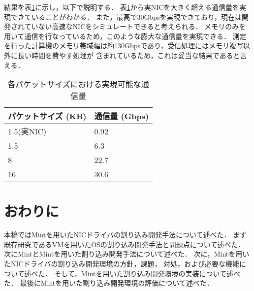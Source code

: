 \documentclass[submit,techreq,noauthor,dvipdfmx]{ipsj}
\begin{document}
結果を表\ref{throughput-nic}に示し，以下で説明する．
表\ref{throughput-nic}から実NICを大きく超える通信量を実現できていることがわかる．
また，最高で30Gbpsを実現できており，現在は開発されていない高速なNICをシミュレートできると考えられる．
メモリのみを用いて通信を行なっているため，このような膨大な通信量を実現できる．
測定を行った計算機のメモリ帯域幅は約130Gbpsであり，受信処理にはメモリ複写以外に長い時間を費やす処理が
含まれているため，これは妥当な結果であると言える．

\begin{table}[h]
    \caption{各パケットサイズにおける実現可能な通信量}
    \label{throughput-nic}
    \begin{center}
        \begin{tabular}{l|l}   \hline \hline 
            パケットサイズ (KB)      & 通信量 (Gbps)  \\ \hline
            1.5(実NIC)               & 0.92           \\
            1.5                      & 6.3            \\
            8                        & 22.7           \\
            16                       & 30.6           \\ \hline
        \end{tabular}
    \end{center}
\end{table}


\section{おわりに}\label{chap:conclusion}

本稿ではMintを用いたNICドライバの割り込み開発手法について述べた．
まず既存研究であるVMを用いたOSの割り込み開発手法と問題点について述べた．
次にMintとMintを用いた割り込み開発手法について述べた．
次に，Mintを用いたNICドライバの割り込み開発環境の方針，課題，
対処，および必要な機能について述べた．
そして，Mintを用いた割り込み開発環境の実装について述べた．
最後にMintを用いた割り込み開発環境の評価について述べた．
\end{document}

